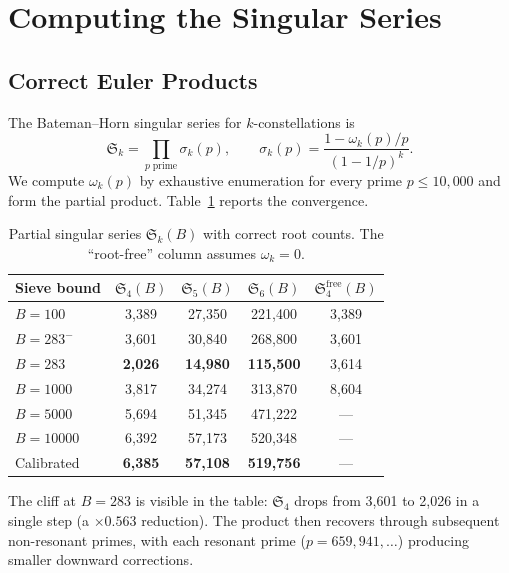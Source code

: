 \documentclass[11pt,a4paper]{article}
\begin{document}
\section{Computing the Singular Series}\label{sec:singular}

\subsection{Correct Euler Products}

The Bateman--Horn singular series for $k$-constellations is
\begin{equation}\label{eq:Sk}
  \mathfrak{S}_k = \prod_{p\;\mathrm{prime}} \sigma_k(p), \qquad
  \sigma_k(p) = \frac{1 - \omega_k(p)/p}{(1 - 1/p)^k}.
\end{equation}
We compute $\omega_k(p)$ by exhaustive enumeration for every prime
$p \leq 10{,}000$ and form the partial product.
Table~\ref{tab:singular} reports the convergence.

\begin{table}[H]
\centering
\caption{Partial singular series $\mathfrak{S}_k(B)$ with correct
root counts.  The ``root-free'' column assumes
$\omega_k = 0$.}\label{tab:singular}
\smallskip
\begin{tabular}{lcccc}
\toprule
Sieve bound & $\mathfrak{S}_4(B)$ & $\mathfrak{S}_5(B)$ &
  $\mathfrak{S}_6(B)$ & $\mathfrak{S}_4^{\mathrm{free}}(B)$ \\
\midrule
$B = 100$   & 3{,}389 & 27{,}350 & 221{,}400 & 3{,}389 \\
$B = 283^-$ & 3{,}601 & 30{,}840 & 268{,}800 & 3{,}601 \\
$B = 283$   & \textbf{2{,}026} & \textbf{14{,}980} & \textbf{115{,}500} & 3{,}614 \\
$B = 1000$  & 3{,}817 & 34{,}274 & 313{,}870 & 8{,}604 \\
$B = 5000$  & 5{,}694 & 51{,}345 & 471{,}222 & --- \\
$B = 10000$ & 6{,}392 & 57{,}173 & 520{,}348 & --- \\
\midrule
Calibrated  & \textbf{6{,}385} & \textbf{57{,}108} & \textbf{519{,}756} & --- \\
\bottomrule
\end{tabular}
\end{table}

The cliff at $B = 283$ is visible in the table: $\mathfrak{S}_4$
drops from 3{,}601 to 2{,}026 in a single step (a $\times 0.563$
reduction).  The product then recovers through subsequent non-resonant
primes, with each resonant prime ($p = 659, 941, \ldots$) producing
smaller downward corrections.
\end{document}
